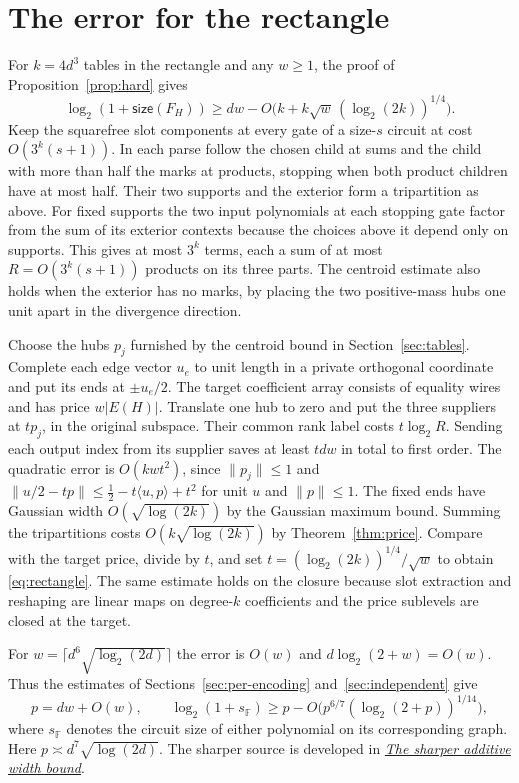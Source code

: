 \documentclass[11pt]{article}
\theoremstyle{definition}
\newcommand{\F}{\mathbb F}
\newcommand{\circuit}{\mathsf{size}}
\begin{document}
\section{The error for the rectangle}\label{sec:rectangle-error}
For \(k=4d^3\) tables in the rectangle and any \(w\ge1\), the proof of Proposition~\ref{prop:hard} gives
\begin{equation}\label{eq:rectangle}
 \log_2(1+\circuit(F_H))\ge dw-O\bigl(k+k\sqrt w\,(\log_2(2k))^{1/4}\bigr).
\end{equation}
Keep the squarefree slot components at every gate of a size-\(s\) circuit at cost \(O(3^k(s+1))\). In each parse follow the chosen child at sums and the child with more than half the marks at products, stopping when both product children have at most half. Their two supports and the exterior form a tripartition as above. For fixed supports the two input polynomials at each stopping gate factor from the sum of its exterior contexts because the choices above it depend only on supports. This gives at most \(3^k\) terms, each a sum of at most \(R=O(3^k(s+1))\) products on its three parts. The centroid estimate also holds when the exterior has no marks, by placing the two positive-mass hubs one unit apart in the divergence direction.

Choose the hubs \(p_j\) furnished by the centroid bound in Section~\ref{sec:tables}. Complete each edge vector \(u_e\) to unit length in a private orthogonal coordinate and put its ends at \(\pm u_e/2\). The target coefficient array consists of equality wires and has price \(w|E(H)|\). Translate one hub to zero and put the three suppliers at \(t p_j\), in the original subspace. Their common rank label costs \(t\log_2 R\). Sending each output index from its supplier saves at least \(tdw\) in total to first order. The quadratic error is \(O(kwt^2)\), since \(\|p_j\|\le1\) and \(\|u/2-tp\|\le\tfrac12-t\langle u,p\rangle+t^2\) for unit \(u\) and \(\|p\|\le1\). The fixed ends have Gaussian width \(O(\sqrt{\log(2k)})\) by the Gaussian maximum bound. Summing the tripartitions costs \(O(k\sqrt{\log(2k)})\) by Theorem~\ref{thm:price}. Compare with the target price, divide by \(t\), and set \(t=(\log_2(2k))^{1/4}/\sqrt w\) to obtain \eqref{eq:rectangle}. The same estimate holds on the closure because slot extraction and reshaping are linear maps on degree-\(k\) coefficients and the price sublevels are closed at the target.

For \(w=\lceil d^6\sqrt{\log_2(2d)}\rceil\) the error is \(O(w)\) and \(d\log_2(2+w)=O(w)\). Thus the estimates of Sections~\ref{sec:per-encoding} and~\ref{sec:independent} give
\begin{equation}\label{eq:rect-loss}
 p=dw+O(w),\qquad \log_2(1+s_{\F})\ge p-O\bigl(p^{6/7}(\log_2(2+p))^{1/14}\bigr),
\end{equation}
where \(s_{\F}\) denotes the circuit size of either polynomial on its corresponding graph. Here \(p\asymp d^7\sqrt{\log(2d)}\). The sharper source is developed in \href{sharper-additive-bound.md}{\emph{The sharper additive width bound}}.
\end{document}
